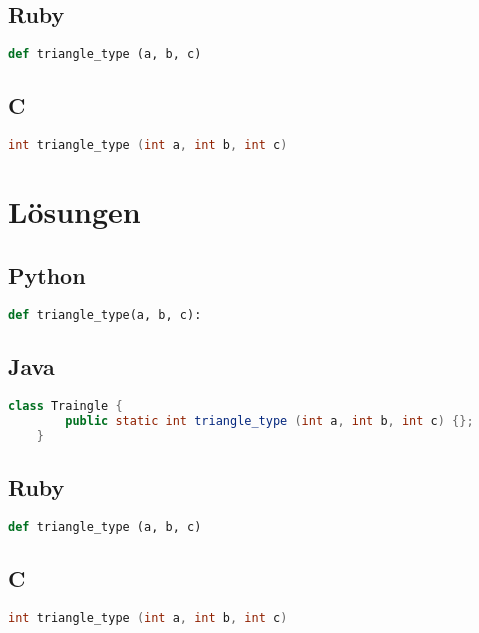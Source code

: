 \documentclass[a4paper]{article}
\begin{document}
\subsection*{Ruby}
\begin{lstlisting}[language=Ruby]
	def triangle_type (a, b, c)
\end{lstlisting}
\subsection*{C}
\begin{lstlisting}[language=C]
	int triangle_type (int a, int b, int c)
\end{lstlisting}
\newpage
\onecolumn
\section*{Lösungen}
\subsection*{Python}
\begin{lstlisting}[language=Python]
	def triangle_type(a, b, c):
\end{lstlisting}
\subsection*{Java}
\begin{lstlisting}[language=Java]
	class Traingle {
		public static int triangle_type (int a, int b, int c) {};
	}
\end{lstlisting}
\subsection*{Ruby}
\begin{lstlisting}[language=Ruby]
	def triangle_type (a, b, c)
\end{lstlisting}
\subsection*{C}
\begin{lstlisting}[language=C]
	int triangle_type (int a, int b, int c)
\end{lstlisting}
\end{document}
